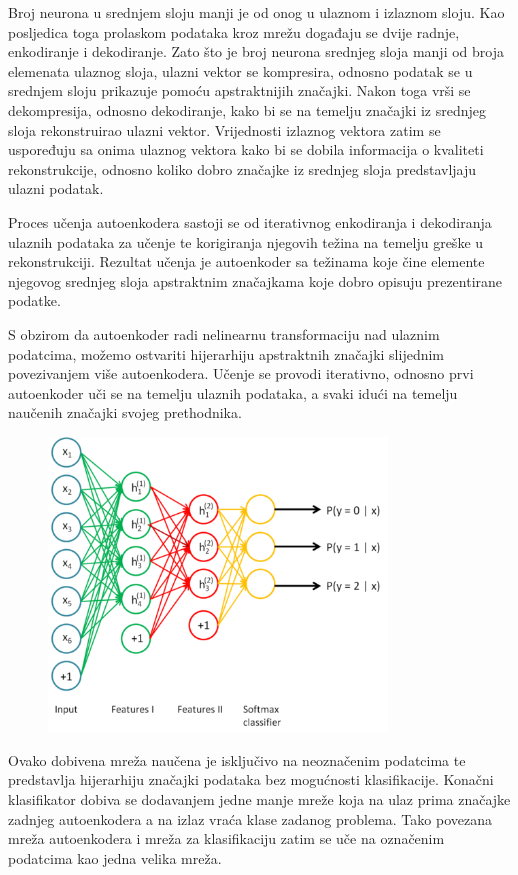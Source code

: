 \documentclass[lmodern, utf8, diplomski, numeric]{fer}
\begin{document}
Broj neurona u srednjem sloju manji je od onog u ulaznom i izlaznom sloju. Kao posljedica toga prolaskom podataka kroz mrežu događaju se dvije radnje, enkodiranje i dekodiranje. Zato što je broj neurona srednjeg sloja manji od broja elemenata ulaznog sloja, ulazni vektor se kompresira, odnosno podatak se u srednjem sloju prikazuje pomoću apstraktnijih značajki. Nakon toga vrši se dekompresija, odnosno dekodiranje, kako bi se na temelju značajki iz srednjeg sloja rekonstruirao ulazni vektor.
Vrijednosti izlaznog vektora zatim se uspoređuju sa onima ulaznog vektora kako bi se dobila informacija o kvaliteti rekonstrukcije, odnosno koliko dobro značajke iz srednjeg sloja predstavljaju ulazni podatak.

Proces učenja autoenkodera sastoji se od iterativnog enkodiranja i dekodiranja ulaznih podataka za učenje te korigiranja njegovih težina na temelju greške u rekonstrukciji. Rezultat učenja je autoenkoder sa težinama koje čine elemente njegovog srednjeg sloja apstraktnim značajkama koje dobro opisuju prezentirane podatke. 

S obzirom da autoenkoder radi nelinearnu transformaciju nad ulaznim podatcima, možemo ostvariti hijerarhiju apstraktnih značajki slijednim povezivanjem više autoenkodera. Učenje se provodi iterativno, odnosno prvi autoenkoder uči se na temelju ulaznih podataka, a svaki idući na temelju naučenih značajki svojeg prethodnika. 

\begin{figure}[ht!]	
\centering
\includegraphics[width=9cm]{slike/stacked_autoencoders.png}
\caption{}
\end{figure}

Ovako dobivena mreža naučena je isključivo na neoznačenim podatcima te predstavlja hijerarhiju značajki podataka bez mogućnosti klasifikacije. Konačni klasifikator dobiva se dodavanjem jedne manje mreže koja na ulaz prima značajke zadnjeg autoenkodera a na izlaz vraća klase zadanog problema. Tako povezana mreža autoenkodera i mreža za klasifikaciju zatim se uče na označenim podatcima kao jedna velika mreža.
\end{document}
